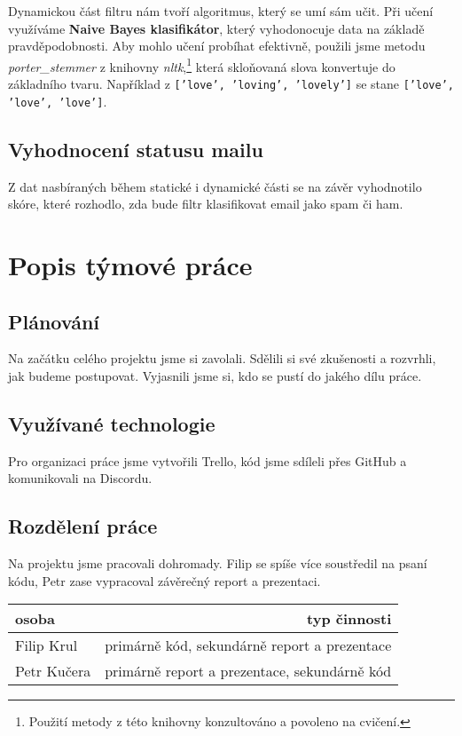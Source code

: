 \documentclass[12pt]{article}
\begin{document}
Dynamickou část filtru nám tvoří algoritmus, který se umí sám učit. Při učení využíváme \textbf{Naive Bayes klasifikátor}, který vyhodonocuje data na základě pravděpodobnosti. Aby mohlo učení probíhat efektivně, použili jsme metodu \emph{porter\_stemmer} z knihovny \emph{nltk},\footnote{Použití metody z této knihovny konzultováno a povoleno na cvičení.} která skloňovaná slova konvertuje do základního tvaru. Například z \texttt{['love', 'loving', 'lovely']} se stane \texttt{['love', 'love', 'love']}.

\subsection{Vyhodnocení statusu mailu}

Z dat nasbíraných během statické i dynamické části se na závěr vyhodnotilo skóre, které rozhodlo, zda bude filtr klasifikovat email jako spam či ham.

\section{Popis týmové práce}

\subsection{Plánování}

Na začátku celého projektu jsme si zavolali. Sdělili si své zkušenosti a rozvrhli, jak budeme postupovat. Vyjasnili jsme si, kdo se pustí do jakého dílu práce.

\subsection{Využívané technologie}

Pro organizaci práce jsme vytvořili Trello, kód jsme sdíleli přes GitHub a komunikovali na Discordu.

\subsection{Rozdělení práce}

Na projektu jsme pracovali dohromady. Filip se spíše více soustředil na psaní kódu, Petr zase vypracoval závěrečný report a prezentaci.

\begin{center}
\begin{tabular}{l|r}
osoba & typ činnosti\\\hline
Filip Krul & primárně kód, sekundárně report a prezentace \\
Petr Kučera & primárně report a prezentace, sekundárně kód
\end{tabular}
\end{center}
\end{document}

